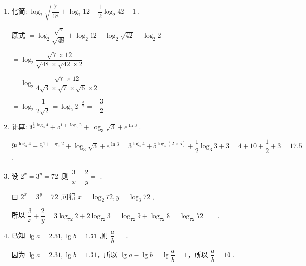 \begin{enumerate}
\begin{jieda}
        $= \left( {{\log }_{2}5 + \dfrac{3}{2}{\log }_{2}5}\right) \left( {2{\log }_{5}2 + 3{\log }_{5}2}\right)$
        
        $= \dfrac{5}{2}{\log }_{2}5 \times  5{\log }_{5}2 = \dfrac{25}{2}{\log }_{2}5 \times  {\log }_{5}2 = \dfrac{25}{2}$ .
    \end{jieda}
    \item 化简: ${\log }_{2}\sqrt{\dfrac{7}{48}} + {\log }_{2}{12} - \dfrac{1}{2}{\log }_{2}{42} - 1$ .
    \begin{jieda}
        原式 $= {\log }_{2}\dfrac{\sqrt{7}}{\sqrt{48}} + {\log }_{2}{12} - {\log }_{2}\sqrt{42} - {\log }_{2}2$
        
        $= {\log }_{2}\dfrac{\sqrt{7} \times  {12}}{\sqrt{48} \times  \sqrt{42} \times  2}$
        
        $= {\log }_{2}\dfrac{\sqrt{7} \times  {12}}{4\sqrt{3} \times  \sqrt{7} \times  \sqrt{6} \times  2}$
        
        $= {\log }_{2}\dfrac{1}{2\sqrt{2}} = {\log }_{2}{2}^{-\frac{3}{2}} =  - \dfrac{3}{2}$ .
    \end{jieda}
    
    \item 计算: ${9}^{\frac{1}{2}{\log }_{3}4} + {5}^{1 + {\log }_{5}2} + {\log }_{3}\sqrt{3} + {{e}}^{\ln 3}$ .
    \begin{jieda}
        ${9}^{\frac{1}{2}{\log }_{3}4} + {5}^{1 + {\log }_{5}2} + {\log }_{3}\sqrt{3} + {{e}}^{\ln 3} = {3}^{{\log }_{3}4} + {5}^{{\log }_{5}\left( {2 \times  5}\right) } + \dfrac{1}{2}{\log }_{3}3 + 3 = 4 + {10} + \dfrac{1}{2} + 3 = {17.5}$ .
    \end{jieda}
    
    \item 设 ${2}^{x} = {3}^{y} = {72}$ ,则 $\dfrac{3}{x} + \dfrac{2}{y} =$ .
    \begin{jieda}
        由 ${2}^{x} = {3}^{y} = {72}$ ,可得 $x = {\log }_{2}{72},y = {\log }_{3}{72}$ ,
        
        所以 $\dfrac{3}{x} + \dfrac{2}{y} = 3{\log }_{72}2 + 2{\log }_{72}3 = {\log }_{72}9 + {\log }_{72}8 = {\log }_{72}{72} = 1$ .
    \end{jieda}
    \item 已知 $\lg a = {2.31},\lg b = {1.31}$ ,则 $\dfrac{a}{b} =$ .
    \begin{jieda}
        因为 $\lg a = {2.31},\lg b = {1.31}$，所以 $\lg a - \lg b = \lg \dfrac{a}{b} = 1$，所以 $\dfrac{a}{b} = {10}$ .
    \end{jieda}
\end{enumerate}
